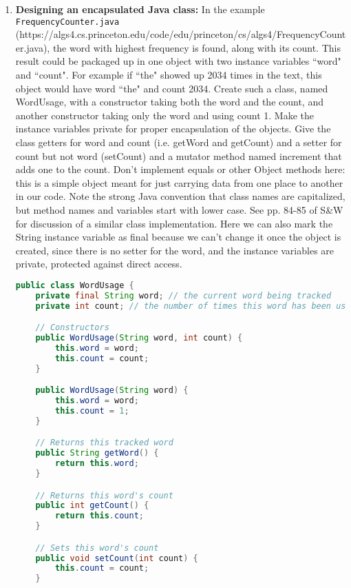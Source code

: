 \documentclass[letterpaper, 11pt]{article}
\begin{document}
\begin{enumerate}[leftmargin=*]
    \item \textbf{Designing an encapsulated Java class:} In the example \texttt{FrequencyCounter.java} \\(https://algs4.cs.princeton.edu/code/edu/princeton/cs/algs4/FrequencyCounter.java), the word with highest frequency is found, along with its count. This result could be packaged up in one object with two instance variables ``word" and ``count". For example if ``the" showed up 2034 times in the text, this object would have word ``the" and count 2034. Create such a class, named WordUsage, with a constructor taking both the word and the count, and another constructor taking only the word and using count 1. Make the instance variables private for proper encapsulation of the objects. Give the class getters for word and count (i.e. getWord and getCount) and a setter for count but not word (setCount) and a mutator method named increment that adds one to the count. Don’t implement equals or other Object methods here: this is a simple object meant for just carrying data from one place to another in our code. Note the strong Java convention that class names are capitalized, but method names and variables start with lower case. See pp. 84-85 of S\&W for discussion of a similar class implementation. Here we can also mark the String instance variable as final because we can’t change it once the object is created, since there is no setter for the word, and the instance variables are private, protected against direct access.

\begin{tcolorbox}[breakable, title=\texttt{WordUsage.java}]
\begin{lstlisting}[language=Java]
public class WordUsage {
    private final String word; // the current word being tracked
    private int count; // the number of times this word has been used

    // Constructors
    public WordUsage(String word, int count) {
        this.word = word;
        this.count = count;
    }

    public WordUsage(String word) {
        this.word = word;
        this.count = 1;
    }

    // Returns this tracked word
    public String getWord() {
        return this.word;
    }

    // Returns this word's count
    public int getCount() {
        return this.count;
    }

    // Sets this word's count
    public void setCount(int count) {
        this.count = count;
    }


\end{lstlisting}
\end{tcolorbox}
\end{enumerate}
\end{document}
